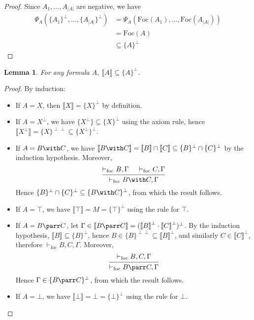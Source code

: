 \documentclass{article}
\newcommand\size[1]{{\lvert #1 \rvert}}
\newcommand\sem[1]{{\llbracket #1 \rrbracket}}
\newcommand\biperp{{\perp\perp}}
\newcommand\vdashfoc{\vdash_\text{foc}}
\newcommand\Foc{\text{Foc}}
\newtheorem{lemma}[theorem]{Lemma}
\begin{document}
\begin{proof}
    Since $A_1, \dots, A_\size{A}$ are negative, we have \begin{align*}
        \Psi_A(\{A_1\}^\perp, \dots, \{A_\size{A}\}^\perp) &= \Psi_A(\Foc(A_1), \dots, \Foc(A_\size{A})) \\
        &= \Foc(A) \\
        &\subseteq \{A\}^\perp
    \end{align*}
\end{proof}

\begin{lemma}
    \label{meaning_is_provability}
    For any formula $A$, $\sem{A} \subseteq \{A\}^\perp$.
\end{lemma}
\begin{proof}
    By induction:
    \begin{itemize}
        \item If $A = X$, then $\sem{X} = \{X\}^\perp$ by definition.
        \item If $A = X^\perp$, we have $\{X^\perp\} \subseteq \{X\}^\perp$ using the axiom rule, hence $\sem{X^\perp} = \{X\}^\biperp \subseteq \{X^\perp\}^\perp$.
        \item If $A = B \with C$, we have $\sem{B \with C} = \sem{B} \cap \sem{C} \subseteq \{B\}^\perp \cap \{C\}^\perp$ by the induction hypothesis. Moreover,
        $$\begin{prooftree}
            \hypo{\vdashfoc B, \Gamma}
            \hypo{\vdashfoc C, \Gamma}
            \infer2{\vdashfoc B \with C, \Gamma}
        \end{prooftree}$$
        Hence $\{B\}^\perp \cap \{C\}^\perp \subseteq \{B \with C\}^\perp$, from which the result follows.
        \item If $A = \top$, we have $\sem{\top} = M = \{\top\}^\perp$ using the rule for $\top$.
        \item If $A = B \parr C$, let $\Gamma \in \sem{B \parr C} = (\sem{B}^\perp \cdot \sem{C}^\perp)^\perp$. By the induction hypothesis, $\sem{B} \subseteq \{B\}^\perp$, hence $B \in \{B\}^\biperp \subseteq \sem{B}^\perp$, and similarly $C \in \sem{C}^\perp$, therefore $\vdashfoc B, C, \Gamma$. Moreover,
        $$\begin{prooftree}
            \hypo{\vdashfoc B, C, \Gamma}
            \infer1{\vdashfoc B \parr C, \Gamma}
        \end{prooftree}$$
        Hence $\Gamma \in \{B \parr C\}^\perp$, from which the result follows.
        \item If $A = \bot$, we have $\sem{\bot} = \bot = \{\bot\}^\perp$ using the rule for $\bot$.

\end{itemize}
\end{proof}
\end{document}
